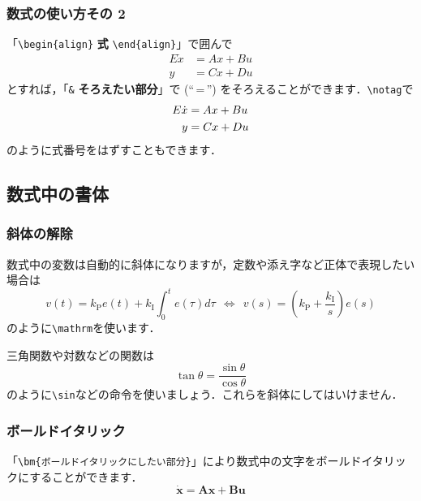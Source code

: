 \subsubsection{数式の使い方その 2}
「{\verb+\begin{align}+ \textbf{式} \verb+\end{align}+}」で囲んで
\begin{align}
	E\dot{x} &= Ax + Bu \\
	y &= Cx + Du
\end{align}
とすれば，「\verb+&+ \textbf{そろえたい部分}」で (``\,=\,'') をそろえることができます．\verb+\notag+で
\begin{align}
	E\dot{x} &= Ax + Bu \notag \\
	y &= Cx + Du
\end{align}
のように式番号をはずすこともできます．

\subsection{数式中の書体}
\subsubsection{斜体の解除}
数式中の変数は自動的に斜体になりますが，定数や添え字など正体で表現したい場合は
\[
	{v}(t) = {k}_\mathrm{P}e(t) 
			+ {k}_\mathrm{I}\int_{0}^{t}{e(\tau)d\tau}
	\ \ \Longleftrightarrow\ \ 
	{v}(s) = \left({k}_\mathrm{P} + \frac{{k}_\mathrm{I}}{s}\right){e}(s)
\]
のように\verb+\mathrm+を使います．

三角関数や対数などの関数は
\[
	\tan\theta = \frac{\sin\theta}{\cos\theta}
\]
のように\verb+\sin+などの命令を使いましょう．これらを斜体にしてはいけません．

\subsubsection{ボールドイタリック}
「\verb+\bm{ボールドイタリックにしたい部分}+」により数式中の文字をボールドイタリックにすることができます．
\begin{equation}
	\bm{\dot{x}} = \bm{Ax} + \bm{Bu}
\end{equation}

